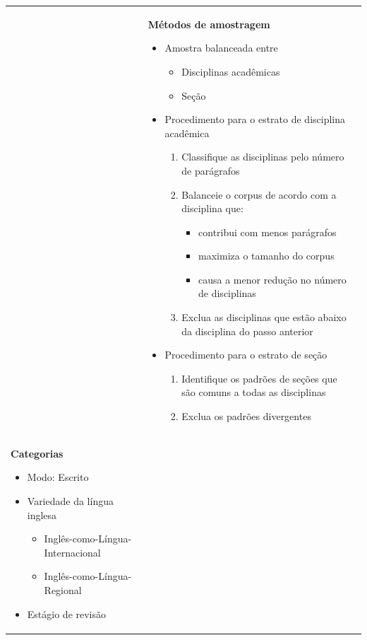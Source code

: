 \begin{longtable}[c]{ |p{8cm}|p{8cm}|p{8cm}| }
     &
    \textbf{Métodos de amostragem}
    \begin{itemize}
        \item Amostra balanceada entre
        \begin{itemize}
            \item Disciplinas acadêmicas
            \item Seção
        \end{itemize}
        \item Procedimento para o estrato de disciplina acadêmica
        \begin{enumerate}
            \item Classifique as disciplinas pelo número de parágrafos
            \item Balanceie o corpus de acordo com a disciplina que:
            \begin{itemize}
                \item contribui com menos parágrafos
                \item maximiza o tamanho do corpus
                \item causa a menor redução no número de disciplinas
            \end{itemize}
            \item Exclua as disciplinas que estão abaixo da disciplina do passo anterior
        \end{enumerate}
        \item Procedimento para o estrato de seção
        \begin{enumerate}
            \item Identifique os padrões de seções que são comuns a todas as disciplinas
            \item Exclua os padrões divergentes
        \end{enumerate}
    \end{itemize}
     \\
    \textbf{Categorias}
    \begin{itemize}
        \item Modo: Escrito
        \item Variedade da língua inglesa
        \begin{itemize}
            \item Inglês-como-Língua-Internacional
            \item Inglês-como-Língua-Regional
        \end{itemize}
        \item Estágio de revisão

\end{itemize}
\end{longtable}
